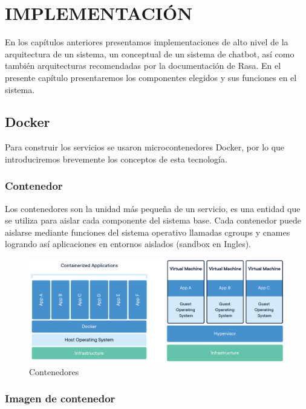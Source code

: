 \chapter[IMPLEMENTACION]{IMPLEMENTACIÓN}
En los capítulos anteriores presentamos implementaciones de alto nivel de la arquitectura de un sistema, un 
conceptual de un sistema de chatbot, así como también arquitecturas recomendadas por la documentación de Rasa. En el presente capítulo presentaremos los componentes elegidos y sus funciones en el sistema.
  
\section{Docker}

Para construir los servicios se usaron microcontenedores Docker, por lo que introduciremos brevemente los conceptos de esta tecnología. 

\subsection{Contenedor}

Los contenedores son la unidad más pequeña de un servicio, es una entidad que se utiliza para aislar cada componente del sistema base. Cada contenedor puede aislarse mediante funciones del sistema operativo llamadas cgroups y cnames logrando así aplicaciones en entornos aislados (sandbox en Ingles). \cite{Docker}   

\begin{figure}[ht]
    \centering
    \includegraphics[width=\textwidth]{imagenes/cap4/docker-container.png}
    \caption{Contenedores}
    \label{fig:container_diagram}
\end{figure}


\subsection{Imagen de contenedor}


